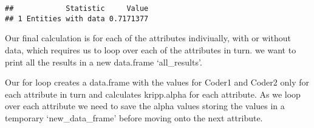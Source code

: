 \documentclass[]{article}
\newenvironment{Shaded}{\begin{snugshade}}{\end{snugshade}}
\newcommand{\KeywordTok}[1]{\textcolor[rgb]{0.13,0.29,0.53}{\textbf{#1}}}
\newcommand{\DataTypeTok}[1]{\textcolor[rgb]{0.13,0.29,0.53}{#1}}
\newcommand{\DecValTok}[1]{\textcolor[rgb]{0.00,0.00,0.81}{#1}}
\newcommand{\StringTok}[1]{\textcolor[rgb]{0.31,0.60,0.02}{#1}}
\newcommand{\ControlFlowTok}[1]{\textcolor[rgb]{0.13,0.29,0.53}{\textbf{#1}}}
\newcommand{\OperatorTok}[1]{\textcolor[rgb]{0.81,0.36,0.00}{\textbf{#1}}}
\newcommand{\NormalTok}[1]{#1}
\begin{document}
\begin{verbatim}
##            Statistic     Value
## 1 Entities with data 0.7171377
\end{verbatim}

Our final calculation is for each of the attributes indiviually, with or
without data, which requires us to loop over each of the attributes in
turn. we want to print all the results in a new data.frame
`all\_results'.

Our for loop creates a data.frame with the values for Coder1 and Coder2
only for each attribute in turn and calculates kripp.alpha for each
attribute. As we loop over each attribute we need to save the alpha
values storing the values in a temporary `new\_data\_frame' before
moving onto the next attribute.

\begin{Shaded}
\end{Shaded}
\end{document}
